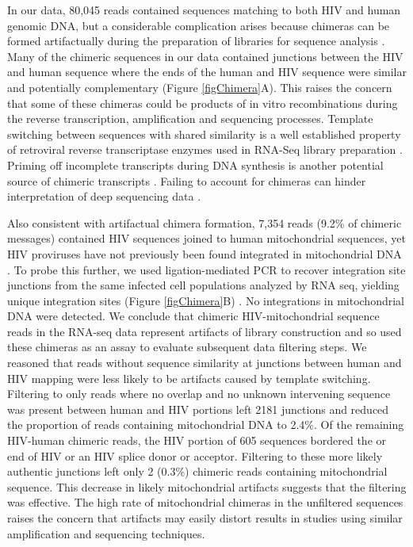 \documentclass[../sherrill-Mix_thesis.tex]{subfiles}
\begin{document}
		In our data, 80,045 reads contained sequences matching to both HIV and human genomic DNA, but a considerable complication arises because chimeras can be formed artifactually during the preparation of libraries for sequence analysis \citep{Paeaebo1990,Odelberg1995,Zeng2002,Tasic2002,Geiszt2004,Cocquet2006,McManus2010,Cogne2014}. Many of the chimeric sequences in our data contained junctions between the HIV and human sequence where the ends of the human and HIV sequence were similar and potentially complementary (Figure \ref{figChimera}A). This raises the concern that some of these chimeras could be products of in vitro recombinations during the reverse transcription, amplification and sequencing processes. Template switching between sequences with shared similarity is a well established property of retroviral reverse transcriptase enzymes used in RNA-Seq library preparation \citep{Gilboa1979,Luo1990,Houseley2010}. Priming off incomplete transcripts during DNA synthesis is another potential source of chimeric transcripts \citep{Paeaebo1990,Meyerhans1990,Odelberg1995,Lahr2009}. Failing to account for chimeras can hinder interpretation of deep sequencing data \citep{Zeng2002,Tasic2002,Geiszt2004,Cocquet2006,McManus2010,Cogne2014}.

		Also consistent with artifactual chimera formation, 7,354 reads (9.2\%  of chimeric messages) contained HIV sequences joined to human mitochondrial sequences, yet HIV proviruses have not previously been found integrated in mitochondrial DNA \citep{Wang2007}. To probe this further, we used ligation-mediated PCR to recover integration site junctions from the same infected cell populations analyzed by RNA seq, yielding \nIntegrations{} unique integration sites (Figure \ref{figChimera}B) \citep{Berry2014}.  No integrations in mitochondrial DNA were detected. We conclude that chimeric HIV-mitochondrial sequence reads in the RNA-seq data represent artifacts of library construction and so used these chimeras as an assay to evaluate subsequent data filtering steps.  We reasoned that reads without sequence similarity at junctions between human and HIV mapping were less likely to be artifacts caused by template switching. Filtering to only reads where no overlap and no unknown intervening sequence was present between human and HIV portions left 2181 junctions and reduced the proportion of reads containing mitochondrial DNA to 2.4\%. Of the remaining HIV-human chimeric reads, the HIV portion of 605 sequences bordered the \threePrime{} or \fivePrime{} end of HIV or an HIV splice donor or acceptor. Filtering to these more likely authentic junctions left only 2 (0.3\%) chimeric reads containing mitochondrial sequence. This decrease in likely mitochondrial artifacts suggests that the filtering was effective. The high rate of mitochondrial chimeras in the unfiltered sequences raises the concern that artifacts may easily distort results in studies using similar amplification and sequencing techniques.
\end{document}
